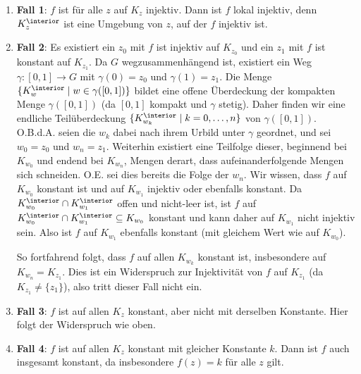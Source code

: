 \documentclass[a4paper]{article}
\begin{document}
\begin{enumerate}
    \item \textbf{Fall 1}: $f$ ist für alle $z$ auf $K_z$ injektiv.
    Dann ist $f$ lokal injektiv, denn $K_z^{\interior}$ ist eine Umgebung von $z$, auf der $f$ injektiv ist.
    \item \textbf{Fall 2}: Es existiert ein $z_0$ mit $f$ ist injektiv auf $K_{z_0}$ und ein $z_1$ mit $f$ ist konstant auf $K_{z_1}$.
    Da $G$ wegzusammenhängend ist, existiert ein Weg $\gamma: [0,1] \to G$ mit $\gamma(0) = z_0$ und $\gamma(1) = z_1$. 
    Die Menge $\{ K_w^\interior \mid w \in \gamma([0,1]) \}$ bildet eine offene Überdeckung der kompakten Menge $\gamma([0,1])$ (da $[0,1]$ kompakt und $\gamma$ stetig). 
    Daher finden wir eine endliche Teilüberdeckung $\{ K_{w_k}^\interior \mid k = 0, \dots, n\}$ von $\gamma([0,1])$.
    O.B.d.A. seien die $w_k$ dabei nach ihrem Urbild unter $\gamma$ geordnet, und sei $w_0 = z_0$ und $w_n = z_1$.
    Weiterhin existiert eine Teilfolge dieser, beginnend bei $K_{w_0}$ und endend bei $K_{w_n}$, Mengen derart, dass aufeinanderfolgende Mengen sich schneiden.
    O.E. sei dies bereits die Folge der $w_n$.
    Wir wissen, dass $f$ auf $K_{w_0}$ konstant ist und auf $K_{w_1}$ injektiv oder ebenfalls konstant. Da $K_{w_0}^\interior \cap K_{w_1}^\interior$ offen und nicht-leer ist, ist $f$ auf $K_{w_0}^\interior \cap K_{w_1}^\interior \subseteq K_{w_0}$ konstant und kann daher auf $K_{w_1}$ nicht injektiv sein.
    Also ist $f$ auf $K_{w_1}$ ebenfalls konstant (mit gleichem Wert wie auf $K_{w_0}$).

    So fortfahrend folgt, dass $f$ auf allen $K_{w_k}$ konstant ist, insbesondere auf $K_{w_n} = K_{z_1}$.
    Dies ist ein Widerspruch zur Injektivität von $f$ auf $K_{z_1}$ (da $K_{z_1} \neq \{z_1\}$), also tritt dieser Fall nicht ein.
    \item \textbf{Fall 3}: $f$ ist auf allen $K_z$ konstant, aber nicht mit derselben Konstante. Hier folgt der Widerspruch wie oben.
    \item \textbf{Fall 4}: $f$ ist auf allen $K_z$ konstant mit gleicher Konstante $k$. Dann ist $f$ auch insgesamt konstant, da insbesondere $f(z) = k$ für alle $z$ gilt.
\end{enumerate}
\end{document}
